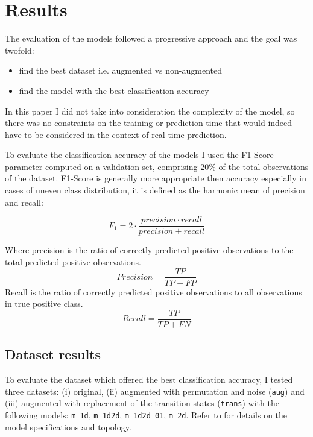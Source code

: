
\section{Results}
\label{sec:results}

The evaluation of the models followed a progressive approach and the goal was twofold:
\begin{itemize}
\item find the best dataset i.e. augmented vs \mbox{non-augmented}
\item find the model with the best classification accuracy
\end{itemize}
In this paper I did not take into consideration the complexity of the model, so there was no constraints on the training or prediction time that would indeed have to be considered in the context of \mbox{real-time} prediction. \par

To evaluate the classification accuracy of the models I used the \mbox{F1-Score} parameter computed on a validation set, comprising 20\% of the total observations of the dataset. \mbox{F1-Score} is generally more appropriate then accuracy especially in cases of uneven class distribution, it is defined as the harmonic mean of precision and recall:

$$F_1 = 2 \cdot \frac{precision \cdot recall}{precision + recall}$$

Where precision is the ratio of correctly predicted positive observations to the total predicted positive observations.
$$Precision = \frac{TP}{TP+FP}$$
Recall is the ratio of correctly predicted positive observations to all observations in true positive class.
$$Recall = \frac{TP}{TP+FN}$$

\subsection{Dataset results}
\label{sec:dataset_results}

To evaluate the dataset which offered the best classification accuracy, I tested three datasets: (i) original, (ii) augmented with permutation and noise (\texttt{aug}) and (iii) augmented with replacement of the transition states (\texttt{trans}) with the following models: \texttt{m_1d}, \texttt{m_1d2d}, \texttt{m_1d2d_01}, \texttt{m_2d}. Refer to  for details on the model specifications and topology.\\

